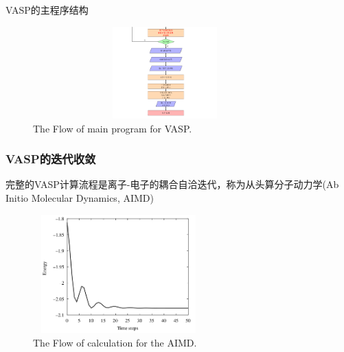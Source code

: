 {\begin{frame}[allowframebreaks]{\textrm{VASP}的主程序结构}
\begin{figure}[h!]
\includegraphics[height=1.40in,width=4.0in,viewport=0 0 562 215,clip]{Figures/VASP_main_Flow-4.png}
\caption{\tiny \textrm{The Flow of main program for VASP.}}%
\label{FLOW_of_VASP}
\end{figure}
\end{frame}

\frame
{
	\frametitle{\textrm{VASP}的迭代收敛}
	完整的\textrm{VASP}计算流程是离子-电子的耦合自洽迭代，称为从头算分子动力学\textrm{(Ab Initio Molecular Dynamics, AIMD)}
\vskip 3pt
	{\fontsize{6.2pt}{4.2pt}}
\begin{figure}[h!]
	\vspace{-0.2in}
\centering
\includegraphics[height=1.8in,width=2.6in,viewport=0 0 740 600,clip]{Figures/Ab-initio-Ene.png}
\caption{\tiny \textrm{The Flow of calculation for the AIMD.}}%
\label{PAW_AIMD}
\end{figure} 
}

}
